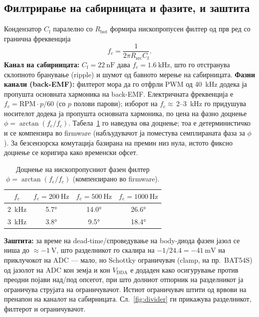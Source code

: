 \documentclass[journal,onecolumn,11pt]{IEEEtran}
\begin{document}
\subsection{Филтрирање на сабирницата и фазите, и заштита}\label{sec:vfilter}
Кондензатор \(C_{\mathrm{f}}\) паралелно со \(R_{\mathrm{bot}}\) формира нископропусен филтер од прв
ред со гранична фреквенција
\begin{equation}
f_c=\frac{1}{2\pi R_{\mathrm{src}}C_{\mathrm{f}}} .
\end{equation}
\textbf{Канал на сабирницата:} \(C_{\mathrm{f}}=\SI{22}{\nano\farad}\) дава
\(f_c=\SI{1.6}{\kilo\hertz}\), што го отстранува склопното бранување (ripple) и шумот од бавното мерење
на сабирницата. \textbf{Фазни канали (back-EMF):} филтерот мора да го отфрли PWM од
\SI{40}{\kilo\hertz} додека ја пропушта основната хармоника на back-EMF. Електричната фреквенција е
\(f_e=\mathrm{RPM}\cdot p/60\) (со \(p\) полови парови); изборот на
\(f_c\approx\)\,2--\SI{3}{\kilo\hertz} го придушува носителот додека ја пропушта основната хармоника,
по цена на фазно доцнење \(\phi=\arctan(f_e/f_c)\). Табела~\ref{tab:phase} го наведува ова доцнење; тоа
е детерминистичко и се компензира во firmware (набљудувачот ја поместува семплираната фаза за \(\phi\)).
За безсензорска комутација базирана на премин низ нула, истото фиксно доцнење се коригира како временски
офсет.

\begin{table}[t]
\centering
\caption{Доцнење на нископропусниот фазен филтер $\phi=\arctan(f_e/f_c)$ (компензирано во firmware).}
\label{tab:phase}
\small
\begin{tabular}{c c c c}
\toprule
$f_c$ & $f_e=\SI{200}{\hertz}$ & $f_e=\SI{500}{\hertz}$ & $f_e=\SI{1000}{\hertz}$\\
\midrule
\SI{2}{\kilo\hertz} & \ang{5.7} & \ang{14.0} & \ang{26.6}\\
\SI{3}{\kilo\hertz} & \ang{3.8} & \ang{9.5}  & \ang{18.4}\\
\bottomrule
\end{tabular}
\end{table}

\textbf{Заштита:} за време на dead-time/спроведување на body-диода фазен јазол се ниша до
\(\approx\SI{-1}{\volt}\), што разделникот го скалира на \(-1/24.4=\SI{-41}{\milli\volt}\) на приклучокот
на ADC --- мало, но Schottky ограничувач (clamp, на пр.\ BAT54S) од јазолот на ADC кон земја и кон
\(V_{\mathrm{DDA}}\) е додаден како осигурување против преодни појави над/под опсегот, при што долниот
отпорник на разделникот ја ограничува струјата на ограничувачот. Истиот ограничувач штити од врвови на
пренапон на каналот на сабирницата. Сл.~\ref{fig:divider} ги прикажува разделникот, филтерот и
ограничувачот.
\end{document}
